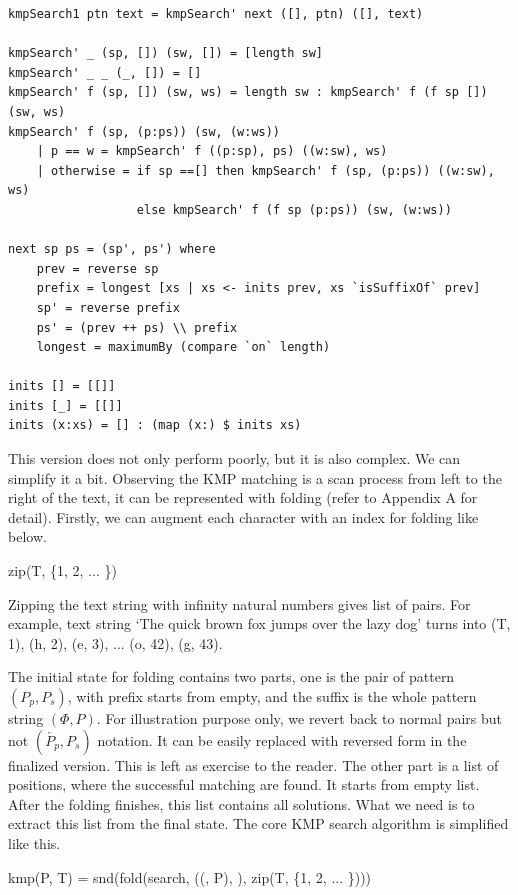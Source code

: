 \documentclass[UTF8]{article}
\begin{document}
\lstset{language=Haskell}
\begin{lstlisting}
kmpSearch1 ptn text = kmpSearch' next ([], ptn) ([], text)

kmpSearch' _ (sp, []) (sw, []) = [length sw]
kmpSearch' _ _ (_, []) = []
kmpSearch' f (sp, []) (sw, ws) = length sw : kmpSearch' f (f sp []) (sw, ws)
kmpSearch' f (sp, (p:ps)) (sw, (w:ws))
    | p == w = kmpSearch' f ((p:sp), ps) ((w:sw), ws)
    | otherwise = if sp ==[] then kmpSearch' f (sp, (p:ps)) ((w:sw), ws)
                  else kmpSearch' f (f sp (p:ps)) (sw, (w:ws))

next sp ps = (sp', ps') where
    prev = reverse sp
    prefix = longest [xs | xs <- inits prev, xs `isSuffixOf` prev]
    sp' = reverse prefix
    ps' = (prev ++ ps) \\ prefix
    longest = maximumBy (compare `on` length)

inits [] = [[]]
inits [_] = [[]]
inits (x:xs) = [] : (map (x:) $ inits xs)
\end{lstlisting} %

This version does not only perform poorly, but it is also complex. We can simplify it a bit. Observing
the KMP matching is a scan process from left to the right of the text, it can be represented
with folding (refer to Appendix A for detail). Firstly, we can augment each character with an index
for folding like below.

\be
zip(T, \{1, 2, ... \})
\ee

Zipping the text string with infinity natural numbers gives list of pairs. For example,
text string `The quick brown fox jumps over the lazy dog' turns into (T, 1), (h, 2), (e, 3), ...
(o, 42), (g, 43).

The initial state for folding contains two parts, one is the pair of pattern $(P_p, P_s)$, with
prefix starts from empty, and the suffix is the whole pattern string $(\Phi, P)$. For illustration
purpose only, we revert back to normal pairs but not $(\overleftarrow{P_p}, P_s)$ notation.
It can be easily replaced with reversed form in the finalized version. This is left as exercise
to the reader. The other part
is a list of positions, where the successful matching are found. It starts from empty list.
After the folding finishes, this list contains all solutions. What we need is to extract this
list from the final state. The core KMP search algorithm is simplified like this.

\be
kmp(P, T) = snd(fold(search, ((\Phi, P), \Phi), zip(T, \{1, 2, ... \})))
\ee
\end{document}
